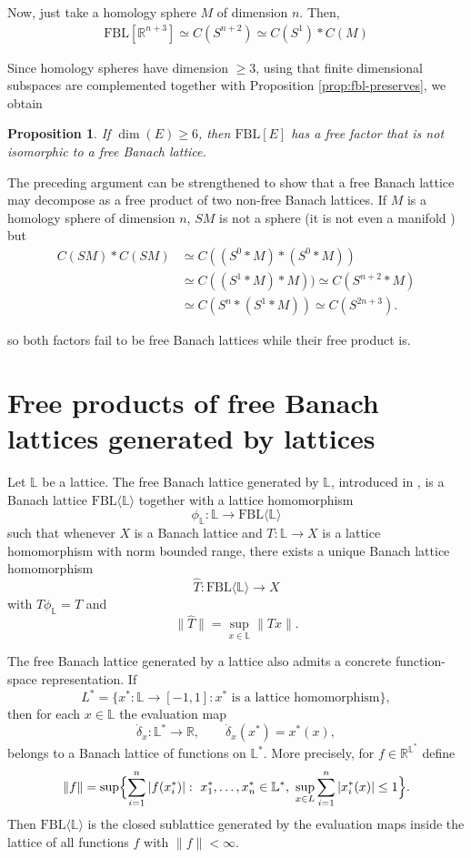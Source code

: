 \documentclass[12pt]{amsart}
\newcommand{\FBL}{\mathrm{FBL}}
\theoremstyle{plain}
\newtheorem{proposition}[theorem]{Proposition}
\theoremstyle{definition}
\begin{document}
Now, just take a homology sphere $M$ of dimension $n$. Then,
\begin{align*}
    \FBL[\mathbb{R}^{n+3}]\simeq C(S^{n+2})\simeq C(S^1)*C(M)
\end{align*}

Since homology spheres have dimension $\geq3$, using that finite dimensional subspaces are complemented together with Proposition \ref{prop:fbl-preserves}, we obtain



\begin{proposition}\label{prop:nonfree-factor}
If $\dim(E)\geq 6$, then $\FBL[E]$ has a free factor that is not isomorphic to a free Banach lattice.
\end{proposition}


The preceding argument can be strengthened to show that a free Banach lattice may decompose as a free product of two non-free Banach lattices. If $M$ is a homology sphere of dimension $n$, $SM$ is not a sphere (it is not even a manifold \cite[Example 10.4.9]{Davis}) but 
\begin{align*}
C(SM)*C(SM)&\simeq C((S^0*M)*(S^0*M)) \\
&\simeq C((S^1*M)*M))\simeq C(S^{n+2}*M) \\ 
&\simeq C(S^n*(S^1*M))\simeq C(S^{2n+3}).
\end{align*}

so both factors fail to be free Banach lattices while their free product is.



\section{Free products of free Banach lattices generated by lattices}\label{sec:freelattice}

Let $\mathbb L$ be a lattice. The free Banach lattice generated by $\mathbb L$, introduced in \cite{freebanlatlat}, is a Banach lattice $\FBL\langle \mathbb L\rangle$ together with a lattice homomorphism
\[
\phi_{\mathbb L}:{\mathbb L}\to \FBL\langle \mathbb L\rangle
\]
such that whenever $X$ is a Banach lattice and $T:{\mathbb L}\to X$ is a lattice homomorphism with norm bounded range, there exists a unique Banach lattice homomorphism
\[
\widehat{T}:\FBL\langle \mathbb L\rangle\to X
\]
with $\widehat{T}\phi_{\mathbb L}=T$ and
\[
\|\widehat{T}\|=\sup_{x\in\mathbb L}\|Tx\|.
\]

The free Banach lattice generated by a lattice also admits a concrete function-space representation. If
\[
L^*=\{x^*:{\mathbb L}\to [-1,1]: x^*\text{ is a lattice homomorphism}\},
\]
then for each $x\in \mathbb L$ the evaluation map
\[
\dot{\delta}_x:{\mathbb L}^*\to \mathbb{R},
\qquad
\dot{\delta}_x(x^*)=x^*(x),
\]
belongs to a Banach lattice of functions on $\mathbb L^*$. More precisely, for $f\in \mathbb{R}^{\mathbb L^*}$ define
\[
\|f\|
=
\sup\Bigl\{\sum_{i=1}^n |f(x_i^*)|:\ x_1^*,\dots,x_n^*\in \mathbb L^*,\ \sup_{x\in L}\sum_{i=1}^n |x_i^*(x)|\leq 1\Bigr\}.
\]
Then $\FBL\langle \mathbb L\rangle$ is the closed sublattice generated by the evaluation maps inside the lattice of all functions $f$ with $\|f\|<\infty$.
\end{document}
